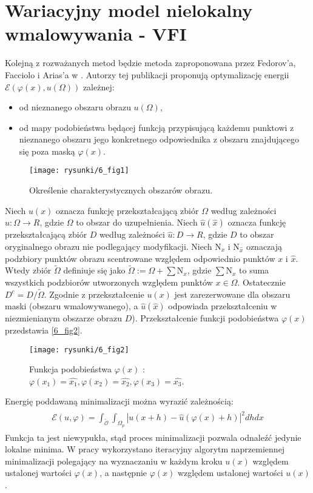 \documentclass[12pt, twoside, openany]{report}
\theoremstyle{definition}
\newcommand*{\abs}[1]{\left\vert{#1}\right\vert}
\begin{document}
\section{Wariacyjny model nielokalny wmalowywania - VFI}
Kolejną z rozważanych metod będzie metoda zaproponowana przez Fedorov'a, Facciolo i Arias'a w \cite{arias2011variational}. Autorzy tej publikacji proponują optymalizację energii $\mathcal{E}(\varphi(x), u(\Omega))$ zależnej:
\begin{itemize}
\item
od nieznanego obszaru obrazu $u(\Omega)$,
\item
od mapy podobieństwa będącej funkcją przypisującą każdemu punktowi z nieznanego obszaru jego konkretnego odpowiednika z obszaru znajdującego się poza maską $\varphi(x)$.
\end{itemize}
\begin{figure}[!h]
	\centering
	\texttt{[image: rysunki/6\_fig1]}
	\caption{Określenie charakterystycznych obszarów obrazu.}
	\label{6_fig1}
\end{figure}
Niech $u(x)$ oznacza funkcję przekształcającą zbiór $\Omega$ według zależności  $u:\Omega \rightarrow R$, gdzie $\Omega$ to obszar do uzupełnienia.
Niech $\hat{u}(\hat{x})$ oznacza funkcję przekształcającą zbiór $D$ według zależności $\hat{u} : D \rightarrow R$, gdzie $D$ to obszar oryginalnego obrazu nie podlegający modyfikacji.
Niech $\mathrm{N}_x$ i $\mathrm{N}_{\hat{x}}$ oznaczają podzbiory punktów obrazu scentrowane względem odpowiednio punktów $x$ i $\hat{x}$.
Wtedy zbiór $\widetilde{\Omega}$ definiuje się jako $\widetilde{\Omega} := \Omega + \sum {\mathrm{N}}_x$, gdzie $\sum {\mathrm{N}}_x$ to suma wszystkich podzbiorów utworzonych względem punktów $x \in \Omega$. Ostatecznie $D^c = D / \widetilde{\Omega}$.
Zgodnie z \cite{arias2011variational} przekształcenie $u(x)$ jest zarezerwowane dla obszaru maski (obszaru wmalowywanego), a $\hat{u}(\hat{x})$ odpowiada przekształceniu w niezmienianym obszarze obrazu $D$). 
Przekształcenie funkcji podobieństwa $\varphi(x)$ przedstawia \autoref{6_fig2}.
\begin{figure}[!h]
	\centering
	\texttt{[image: rysunki/6\_fig2]}
	\caption{Funkcja podobieństwa $\varphi(x)$ : $\varphi(x_1)=\hat{x_1}, \varphi(x_2)=\hat{x_2}, \varphi(x_3)=\hat{x_3}$.}
	\label{6_fig2}
\end{figure}
Energię poddawaną minimalizacji można wyrazić zależnością:
\begin{align}
\begin{aligned}
\mathcal{E}(u,\varphi) = \int_{\mathcal{\widetilde{O}}}\int_{\Omega_p}\abs{u(x+h) - \hat{u}(\varphi(x)+h)}^2dhdx
\end{aligned}
\end{align}
Funkcja ta jest niewypukła, stąd proces minimalizacji pozwala odnaleźć jedynie lokalne minima. W pracy wykorzystano iteracyjny algorytm naprzemiennej minimalizacji polegający na wyznaczaniu w każdym kroku $u(x)$ względem ustalonej wartości $\varphi(x)$, a następnie $\varphi(x)$ względem ustalonej wartości $u(x)$.
\end{document}
